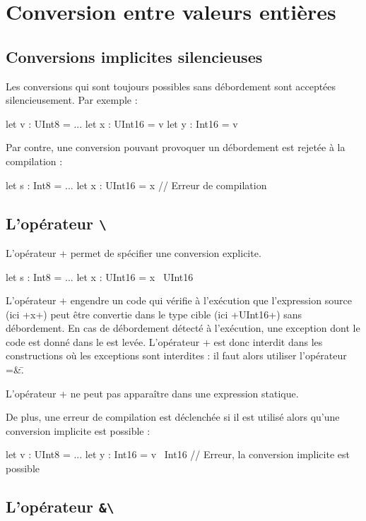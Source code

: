\section{Conversion entre valeurs entières}

\subsection{Conversions implicites silencieuses}
Les conversions qui sont toujours possibles sans débordement sont acceptées silencieusement. Par exemple :
\begin{PLM}
let v : UInt8 = ...
let x : UInt16 = v
let y : Int16 = v
\end{PLM}

Par contre, une conversion pouvant provoquer un débordement est rejetée à la compilation :
\begin{PLM}
let s : Int8 = ...
let x : UInt16 = x // Erreur de compilation
\end{PLM}

\subsection{L'opérateur \texttt{\textbackslash}}
L'opérateur \plm+\+ permet de spécifier une conversion explicite.

\begin{PLM}
let s : Int8 = ...
let x : UInt16 = x \ UInt16
\end{PLM}

L'opérateur \plm+\+ engendre un code qui vérifie à l'exécution que l'expression source (ici \plm+x+) peut être convertie dans le type cible (ici \plm+UInt16+) sans débordement. En cas de débordement détecté à l'exécution, une exception dont le code est donné dans le  est levée. L'opérateur \plm+\+ est donc interdit dans les constructions où les exceptions sont interdites : il faut alors utiliser l'opérateur \plm=&\=.

L'opérateur \plm+\+ ne peut pas apparaître dans une expression statique.

De plus, une erreur de compilation est déclenchée si il est utilisé alors qu'une conversion implicite est possible :
\begin{PLM}
let v : UInt8 = ...
let y : Int16 = v \ Int16 // Erreur, la conversion implicite est possible
\end{PLM}

\subsection{L'opérateur \texttt{\&\textbackslash}}

